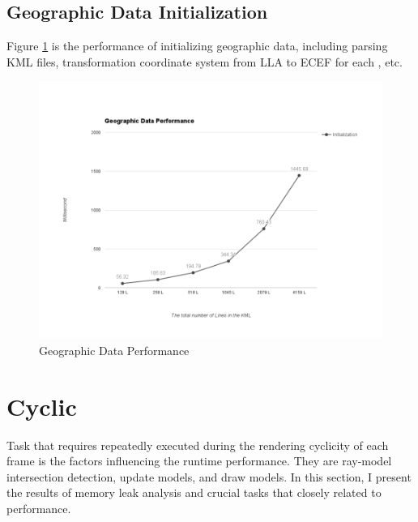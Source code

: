 \subsection{Geographic Data Initialization}

Figure \ref{fig:geographic-data-performance} is the performance of initializing geographic data, including parsing KML files, transformation coordinate system from LLA to ECEF for each , etc.

\begin{figure}[H]
	\caption{Geographic Data Performance}
	\label{fig:geographic-data-performance}
	\centering
	\includegraphics[width=\textwidth, keepaspectratio]{Figures/geographic-data-performance.png}
	\decoRule
\end{figure}

\section{Cyclic}

Task that requires repeatedly executed during the rendering cyclicity of each frame is the factors influencing the runtime performance. They are ray-model intersection detection, update models, and draw models. In this section, I present the results of memory leak analysis and crucial tasks that closely related to performance.

